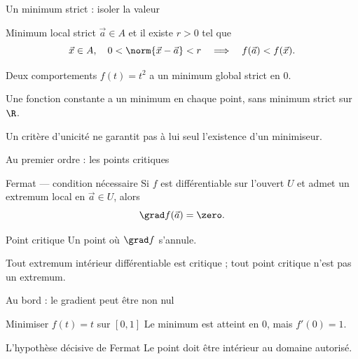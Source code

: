 \begin{frame}[t]{Un minimum strict : isoler la valeur}
\coursanalyse
\begin{notion}{Minimum local strict}
$\vec a\in A$ et il existe $r>0$ tel que
\[\vec x\in A,\quad 0<\norm{\vec x-\vec a}<r\quad\Longrightarrow\quad f(\vec a)<f(\vec x).\]
\end{notion}
\begin{exemple}{Deux comportements}
$f(t)=t^2$ a un minimum global strict en $0$.
\medskip\par Une fonction constante a un minimum en chaque point, sans minimum strict sur $\R$.
\end{exemple}\vfill Un critère d’unicité ne garantit pas à lui seul l’existence d’un minimiseur.
\end{frame}

\begin{frame}[t]{Au premier ordre : les points critiques}
\coursanalyse
\begin{theoreme}{Fermat — condition nécessaire}
Si $f$ est différentiable sur l’ouvert $U$ et admet un extremum local en $\vec a\in U$, alors
\[\grad f(\vec a)=\zero.\]
\end{theoreme}
\begin{notion}{Point critique}
Un point où $\grad f$ s’annule.
\end{notion}\vfill Tout extremum intérieur différentiable est critique ; tout point critique n’est pas un extremum.
\end{frame}

\begin{frame}[t]{Au bord : le gradient peut être non nul}
\coursanalyse
\begin{exemple}{Minimiser $f(t)=t$ sur $[0,1]$}
Le minimum est atteint en $0$, mais $f'(0)=1$.
\end{exemple}
\begin{center}\end{center}
\begin{resultat}{L’hypothèse décisive de Fermat}
Le point doit être intérieur au domaine autorisé.
\end{resultat}
\end{frame}

